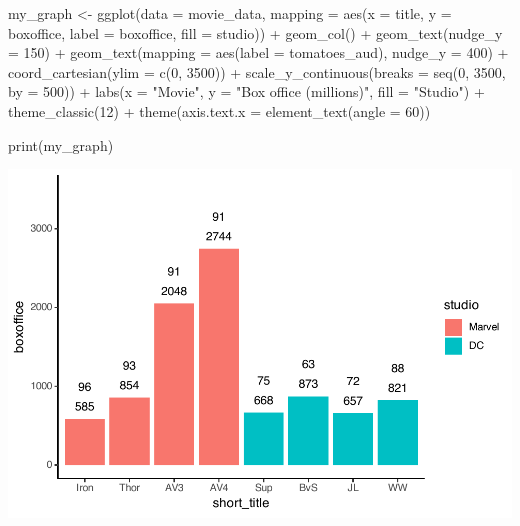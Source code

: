 \documentclass[
]{krantz}
\makeatletter
\newenvironment{Shaded}{\begin{snugshade}}{\end{snugshade}}
\newcommand{\AttributeTok}[1]{\textcolor[rgb]{0.61,0.61,0.61}{#1}}
\newcommand{\DecValTok}[1]{\textcolor[rgb]{0.06,0.06,0.06}{#1}}
\newcommand{\FunctionTok}[1]{\textcolor[rgb]{0,0,0}{#1}}
\newcommand{\NormalTok}[1]{#1}
\newcommand{\OtherTok}[1]{\textcolor[rgb]{0.37,0.37,0.37}{#1}}
\newcommand{\SpecialCharTok}[1]{\textcolor[rgb]{0,0,0}{#1}}
\newcommand{\StringTok}[1]{\textcolor[rgb]{0.5,0.5,0.5}{#1}}
\newenvironment{kframe}{%
\medskip{}
\setlength{\fboxsep}{.8em}
 \def\at@end@of@kframe{}%
 \ifinner\ifhmode%
  \def\at@end@of@kframe{\end{minipage}}%
  \begin{minipage}{\columnwidth}%
 \fi\fi%
 \def\FrameCommand##1{\hskip\@totalleftmargin \hskip-\fboxsep
 \colorbox{shadecolor}{##1}\hskip-\fboxsep
     \hskip-\linewidth \hskip-\@totalleftmargin \hskip\columnwidth}%
 \MakeFramed {\advance\hsize-\width
   \@totalleftmargin\z@ \linewidth\hsize
   \@setminipage}}%
 {\par\unskip\endMakeFramed%
 \at@end@of@kframe}
\renewenvironment{Shaded}{\begin{kframe}}{\end{kframe}}
\makeatother
\begin{document}
\begin{Shaded}
\begin{Highlighting}[]
\NormalTok{my\_graph }\OtherTok{\textless{}{-}} \FunctionTok{ggplot}\NormalTok{(}\AttributeTok{data =}\NormalTok{ movie\_data,}
           \AttributeTok{mapping =} \FunctionTok{aes}\NormalTok{(}\AttributeTok{x =}\NormalTok{ title,}
                         \AttributeTok{y =}\NormalTok{ boxoffice,}
                         \AttributeTok{label =}\NormalTok{ boxoffice, }
                         \AttributeTok{fill =}\NormalTok{ studio)) }\SpecialCharTok{+}
  \FunctionTok{geom\_col}\NormalTok{() }\SpecialCharTok{+}
  \FunctionTok{geom\_text}\NormalTok{(}\AttributeTok{nudge\_y =} \DecValTok{150}\NormalTok{)  }\SpecialCharTok{+}
  \FunctionTok{geom\_text}\NormalTok{(}\AttributeTok{mapping =} \FunctionTok{aes}\NormalTok{(}\AttributeTok{label =}\NormalTok{ tomatoes\_aud), }
            \AttributeTok{nudge\_y =} \DecValTok{400}\NormalTok{) }\SpecialCharTok{+}
  \FunctionTok{coord\_cartesian}\NormalTok{(}\AttributeTok{ylim =} \FunctionTok{c}\NormalTok{(}\DecValTok{0}\NormalTok{, }\DecValTok{3500}\NormalTok{)) }\SpecialCharTok{+}
  \FunctionTok{scale\_y\_continuous}\NormalTok{(}\AttributeTok{breaks =} \FunctionTok{seq}\NormalTok{(}\DecValTok{0}\NormalTok{, }\DecValTok{3500}\NormalTok{, }\AttributeTok{by =} \DecValTok{500}\NormalTok{)) }\SpecialCharTok{+}
  \FunctionTok{labs}\NormalTok{(}\AttributeTok{x =} \StringTok{"Movie"}\NormalTok{,}
       \AttributeTok{y =} \StringTok{"Box office (millions)"}\NormalTok{,}
       \AttributeTok{fill =} \StringTok{"Studio"}\NormalTok{) }\SpecialCharTok{+}
  \FunctionTok{theme\_classic}\NormalTok{(}\DecValTok{12}\NormalTok{) }\SpecialCharTok{+}
  \FunctionTok{theme}\NormalTok{(}\AttributeTok{axis.text.x =} \FunctionTok{element\_text}\NormalTok{(}\AttributeTok{angle =} \DecValTok{60}\NormalTok{))}

\FunctionTok{print}\NormalTok{(my\_graph)}
\end{Highlighting}
\end{Shaded}

\includegraphics[width=0.65\linewidth]{bookdown_files/figure-latex/unnamed-chunk-122-1}
\end{document}
